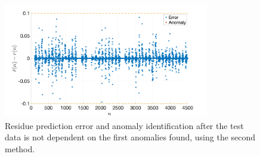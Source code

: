 \documentclass[]{scrartcl}
\begin{document}
\begin{figure}[htbp]
	\centering
	\includegraphics[width= 0.8\textwidth]{figures/R2c_error_an_after_m2.png}
	\caption{Residue prediction error and anomaly identification after the test data is not dependent on the first anomalies found, using the second method.}
	\label{fig:R2c_error_an_after_m2}
\end{figure}
\end{document}
